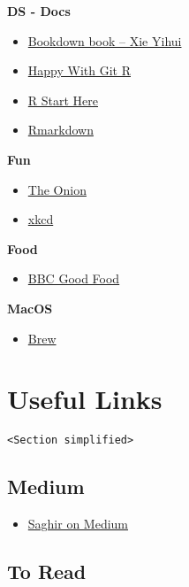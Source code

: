 \documentclass[]{book}
\providecommand{\tightlist}{%
  \setlength{\itemsep}{0pt}\setlength{\parskip}{0pt}}
\theoremstyle{definition}
\theoremstyle{definition}
\theoremstyle{definition}
\theoremstyle{remark}
\begin{document}
\textbf{DS - Docs}

\begin{itemize}
\tightlist
\item
  \href{https://bookdown.org/yihui/bookdown/}{Bookdown book -- Xie
  Yihui}
\item
  \href{http://happygitwithr.com/}{Happy With Git R}
\item
  \href{https://github.com/rstudio/RStartHere}{R Start Here}
\item
  \href{https://bookdown.org/yihui/rmarkdown/}{Rmarkdown}
\end{itemize}

\textbf{Fun}

\begin{itemize}
\tightlist
\item
  \href{https://www.theonion.com/}{The Onion}
\item
  \href{https://xkcd.org/}{xkcd}
\end{itemize}

\textbf{Food}

\begin{itemize}
\tightlist
\item
  \href{https://www.bbcgoodfood.com}{BBC Good Food}
\end{itemize}

\textbf{MacOS}

\begin{itemize}
\tightlist
\item
  \href{https://brew.sh/}{Brew}
\end{itemize}

\chapter{Useful Links}\label{Links}

\texttt{\textless{}Section\ simplified\textgreater{}}

\section{Medium}\label{medium}

\begin{itemize}
\tightlist
\item
  \href{https://medium.com/saghirb}{Saghir on Medium}
\end{itemize}

\section{To Read}\label{to-read}
\end{document}
